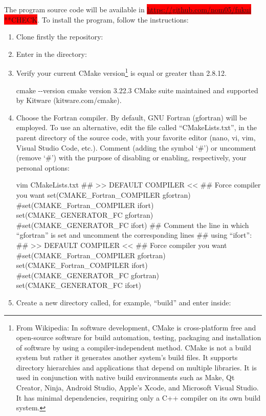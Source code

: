 \documentclass[a4paper,11pt,openany]{memoir}
\begin{document}
The program source code will be available in \colorbox{red}{\url{https://github.com/nom05/fukui} **CHECK}. To install the program, follow the instructions:
\begin{enumerate}
	\item Clone firstly the repository:
	\item Enter in the directory:
	\item Verify your current CMake version\footnote{From Wikipedia: In software development, CMake is cross-platform free and open-source software for build automation, testing, packaging and installation of software by using a compiler-independent method. CMake is not a build system but rather it generates another system's build files. It supports directory hierarchies and applications that depend on multiple libraries. It is used in conjunction with native build environments such as Make, Qt Creator, Ninja, Android Studio, Apple's Xcode, and Microsoft Visual Studio. It has minimal dependencies, requiring only a C++ compiler on its own build system.} is equal or greater than 2.8.12.
		\begin{consola}{cmake -{}-version}
cmake version 3.22.3
CMake suite maintained and supported by Kitware (kitware.com/cmake).
\end{consola}
	\item Choose the Fortran compiler. By default, GNU Fortran (gfortran) will be employed. To use an alternative, edit the file called ``CMakeLists.txt'', in the parent directory of the source code, with your favorite editor (nano, vi, vim, Visual Studio Code, etc.). Comment (adding the symbol `\#') or uncomment (remove `\#') with the purpose of disabling or enabling, respectively, your personal options:
		\begin{consola}{vim CMakeLists.txt}
## >> DEFAULT COMPILER << ## Force compiler you want
set(CMAKE\_Fortran\_COMPILER gfortran)
#set(CMAKE\_Fortran\_COMPILER ifort)
set(CMAKE\_GENERATOR\_FC gfortran)
#set(CMAKE\_GENERATOR\_FC ifort)
## Comment the line in which ``gfortran'' is set and uncomment the corresponding lines
## using ``ifort'':
## >> DEFAULT COMPILER << \#\# Force compiler you want
#set(CMAKE\_Fortran\_COMPILER gfortran)
set(CMAKE\_Fortran\_COMPILER ifort)
#set(CMAKE\_GENERATOR\_FC gfortran)
set(CMAKE\_GENERATOR\_FC ifort)
\end{consola}
	\item Create a new directory called, for example, ``build'' and enter inside:

\end{enumerate}
\end{document}
